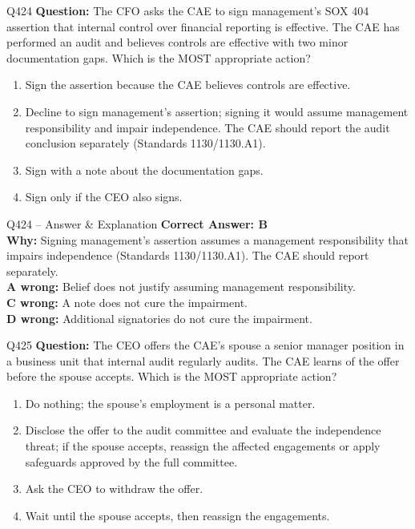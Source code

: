 \documentclass[aspectratio=169,10pt]{beamer}
\begin{document}
	\begin{frame}[t]{Q424}
		\small
		\textbf{Question:} The CFO asks the CAE to sign management's SOX 404 assertion that internal control over financial reporting is effective. The CAE has performed an audit and believes controls are effective with two minor documentation gaps. Which is the MOST appropriate action?
		\begin{enumerate}[label=\Alph*.,itemsep=1pt,topsep=2pt]
			\item Sign the assertion because the CAE believes controls are effective.
			\item Decline to sign management's assertion; signing it would assume management responsibility and impair independence. The CAE should report the audit conclusion separately (Standards 1130/1130.A1).
			\item Sign with a note about the documentation gaps.
			\item Sign only if the CEO also signs.
		\end{enumerate}
	\end{frame}
	
	\begin{frame}[t]{Q424 -- Answer \& Explanation}
		\small
		\textbf{Correct Answer: B} \\[4pt]
		\textbf{Why:} Signing management's assertion assumes a management responsibility that impairs independence (Standards 1130/1130.A1). The CAE should report separately. \\[4pt]
		\textbf{A wrong:} Belief does not justify assuming management responsibility. \\[2pt]
		\textbf{C wrong:} A note does not cure the impairment. \\[2pt]
		\textbf{D wrong:} Additional signatories do not cure the impairment.
	\end{frame}
	
	\begin{frame}[t]{Q425}
		\small
		\textbf{Question:} The CEO offers the CAE's spouse a senior manager position in a business unit that internal audit regularly audits. The CAE learns of the offer before the spouse accepts. Which is the MOST appropriate action?
		\begin{enumerate}[label=\Alph*.,itemsep=1pt,topsep=2pt]
			\item Do nothing; the spouse's employment is a personal matter.
			\item Disclose the offer to the audit committee and evaluate the independence threat; if the spouse accepts, reassign the affected engagements or apply safeguards approved by the full committee.
			\item Ask the CEO to withdraw the offer.
			\item Wait until the spouse accepts, then reassign the engagements.
		\end{enumerate}
	\end{frame}
	
\end{document}

